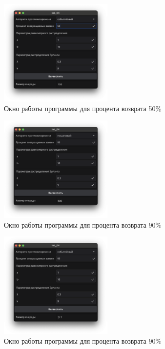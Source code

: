 \begin{figure}[ht]
    \centering
    \includegraphics[width=0.5\textwidth]{assets/4.png}
    \caption{Окно работы программы для процента возврата 50\%}
    \label{fig:4}
\end{figure}

\newpage

\begin{figure}[ht]
    \centering
    \includegraphics[width=0.5\textwidth]{assets/5.png}
    \caption{Окно работы программы для процента возврата 90\%}
    \label{fig:5}
\end{figure}

\begin{figure}[ht]
    \centering
    \includegraphics[width=0.5\textwidth]{assets/6.png}
    \caption{Окно работы программы для процента возврата 90\%}
    \label{fig:6}
\end{figure}

